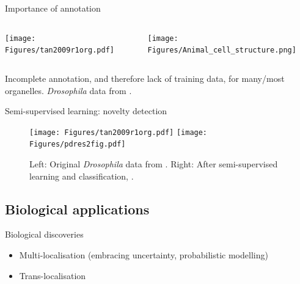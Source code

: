 \begin{frame}{Importance of annotation}
  \begin{columns}[t]
    \begin{column}[T]{0.43\textwidth}
      \begin{centering}
        \texttt{[image: Figures/tan2009r1org.pdf]}
      \end{centering}
    \end{column}
    \begin{column}[T]{0.56\textwidth}
      \texttt{[image: Figures/Animal\_cell\_structure.png]}
    \end{column}
  \end{columns}
  Incomplete annotation, and therefore lack of training data, for
  many/most organelles. \textit{Drosophila} data from \cite{Tan2009}.
\end{frame}

\begin{frame}{Semi-supervised learning: novelty detection}
  \begin{figure}
    \texttt{[image: Figures/tan2009r1org.pdf]}
    \texttt{[image: Figures/pdres2fig.pdf]}
    \caption{Left: Original \textit{Drosophila} data from
      \cite{Tan2009}. Right: After semi-supervised learning and
      classification, \cite{Breckels:2013}.}
  \end{figure}
\end{frame}

\subsection{Biological applications}


\begin{frame}{Biological discoveries}
  \begin{itemize}
  \item Multi-localisation (embracing uncertainty, probabilistic
    modelling)
  \item Trans-localisation
  \end{itemize}
\end{frame}

